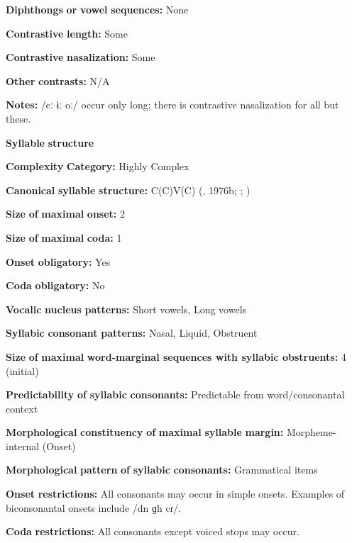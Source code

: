 \begin{styleBody}
\textbf{Diphthongs} \textbf{or} \textbf{vowel} \textbf{sequences:} None

\textbf{Contrastive} \textbf{length:} Some

\textbf{Contrastive} \textbf{nasalization:} Some

\textbf{Other} \textbf{contrasts:} N/A

\textbf{Notes:} /eː ɨː oː/ occur only long; there is contrastive nasalization for all but these.

\textbf{Syllable} \textbf{structure}

\textbf{Complexity} \textbf{Category:} Highly Complex 

\textbf{Canonical} \textbf{syllable} \textbf{structure:} C(C)V(C) (\citealt{Diffloth1976a}, 1976b; \citealt{Sloan1988}; \citealt{Philips2007})

\textbf{Size} \textbf{of} \textbf{maximal} \textbf{onset:} 2

\textbf{Size} \textbf{of} \textbf{maximal} \textbf{coda:} 1

\textbf{Onset} \textbf{obligatory:} Yes

\textbf{Coda} \textbf{obligatory:} No

\textbf{Vocalic} \textbf{nucleus} \textbf{patterns:} Short vowels, Long vowels

\textbf{Syllabic} \textbf{consonant} \textbf{patterns:} Nasal, Liquid, Obstruent

\textbf{Size} \textbf{of} \textbf{maximal} \textbf{word{}-marginal sequences with syllabic obstruents:} 4 (initial)

\textbf{Predictability} \textbf{of} \textbf{syllabic} \textbf{consonants:} Predictable from word/consonantal context

\textbf{Morphological} \textbf{constituency} \textbf{of} \textbf{maximal} \textbf{syllable} \textbf{margin:} Morpheme-internal (Onset)

\textbf{Morphological} \textbf{pattern} \textbf{of} \textbf{syllabic} \textbf{consonants:} Grammatical items

\textbf{Onset} \textbf{restrictions:} All consonants may occur in simple onsets. Examples of biconsonantal onsets include /dn ɡh cɾ/.

\textbf{Coda} \textbf{restrictions:} All consonants except voiced stops may occur.


\end{styleBody}
